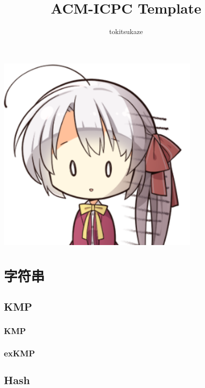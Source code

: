 ﻿\documentclass[a4paper,twocolumn]{article}
\title{ACM-ICPC Template}
\author {tokitsukaze}
\begin{document}
\begin{titlepage}
\maketitle
\vspace*{50pt}
\begin{center}

\includegraphics[width=4in]{1.png}
\end{center}
\end{titlepage}
\newpage
\pagestyle{empty}
\renewcommand{\contentsname}{目录}
\tableofcontents
\newpage\clearpage
\newpage
\pagestyle{fancy}
\setcounter{page}{1}

\section{字符串}
\subsection{KMP}
\subsubsection{KMP}

\subsubsection{exKMP}

\subsection{Hash}
\end{document}
